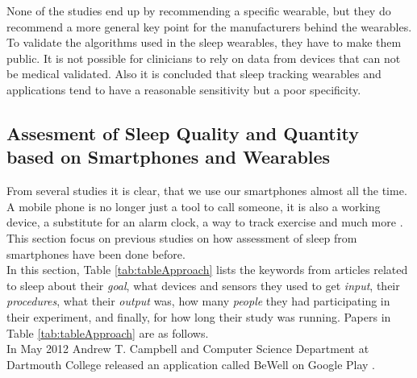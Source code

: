 \documentclass[12pt]{article} %
\begin{document}
None of the studies end up by recommending a specific wearable, but they do recommend a more general key point for the manufacturers behind the wearables. To validate the algorithms used in the sleep wearables, they have to make them public. It is not possible for clinicians to rely on data from devices that can not be medical validated. Also it is concluded that sleep tracking wearables and applications tend to have a reasonable sensitivity but a poor specificity.  

\newpage
\subsection{Assesment of Sleep Quality and Quantity based on Smartphones and Wearables}
From several studies it is clear, that we use our smartphones almost all the time. A mobile phone is no longer just a tool to call someone, it is also a working device, a substitute for an alarm clock, a way to track exercise and much more \cite{dey-wac-ubicomp}. This section focus on previous studies on how assessment of sleep from smartphones have been done before. \\

In this section, Table \ref{tab:tableApproach} lists the keywords from articles related to sleep about their \textit{goal}, what devices and sensors they used to get \textit{input}, their \textit{procedures}, what their \textit{output} was, how many \textit{people} they had participating in their experiment, and finally, for how long their study was running. Papers in Table \ref{tab:tableApproach} are as follows. \\

In May 2012 Andrew T. Campbell and Computer Science Department at Dartmouth College released an application called BeWell on Google Play \cite{bewellDartmouth}. 
\end{document}
